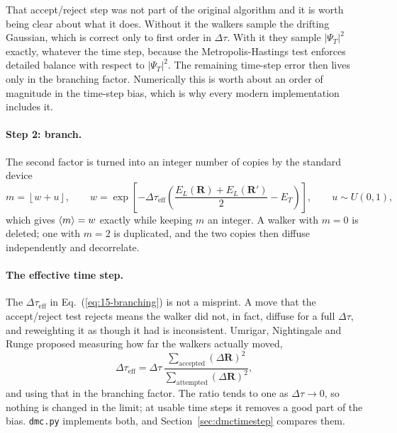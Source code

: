 That accept/reject step was not part of the original algorithm and it is worth
being clear about what it does.  Without it the walkers sample the drifting
Gaussian, which is correct only to first order in $\Delta\tau$.  With it they
sample $|\Psi_T|^2$ exactly, whatever the time step, because the
Metropolis-Hastings test enforces detailed balance with respect to
$|\Psi_T|^2$.  The remaining time-step error then lives only in the branching
factor.  Numerically this is worth about an order of magnitude in the
time-step bias, which is why every modern implementation includes it.

\paragraph{Step 2: branch.}
The second factor is turned into an integer number of copies by the standard
device
\begin{equation}
  m = \left\lfloor w + u \right\rfloor,
  \qquad
  w = \exp\!\left[-\Delta\tau_{\mathrm{eff}}
    \left(\frac{E_L(\bm{R})+E_L(\bm{R}')}{2}-E_T\right)\right],
  \qquad u\sim U(0,1),
  \label{eq:15-branching}
\end{equation}
which gives $\langle m \rangle=w$ exactly while keeping $m$ an integer.  A walker with
$m=0$ is deleted; one with $m=2$ is duplicated, and the two copies then
diffuse independently and decorrelate.

\paragraph{The effective time step.}
The $\Delta\tau_{\mathrm{eff}}$ in Eq.~(\ref{eq:15-branching}) is not a
misprint.  A move that the accept/reject test rejects means the walker did
not, in fact, diffuse for a full $\Delta\tau$, and reweighting it as though it
had is inconsistent.  Umrigar, Nightingale and Runge proposed measuring how
far the walkers actually moved,
\begin{equation}
  \Delta\tau_{\mathrm{eff}}
   = \Delta\tau\,
     \frac{\sum_{\mathrm{accepted}}(\Delta \bm{R})^2}
          {\sum_{\mathrm{attempted}}(\Delta \bm{R})^2},
  \label{eq:15-efftimestep}
\end{equation}
and using that in the branching factor.  The ratio tends to one as
$\Delta\tau\to0$, so nothing is changed in the limit; at usable time steps it
removes a good part of the bias.  \texttt{dmc.py} implements both, and
Section~\ref{sec:dmctimestep} compares them.

